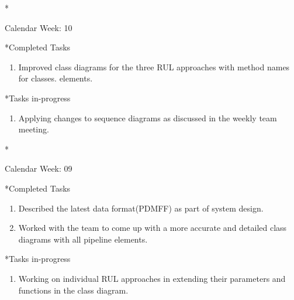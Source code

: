 \documentclass[11pt,a4paper]{article}
\begin{document}
\newpage
\begin{section}*{Calendar Week: 10  \hfill \date{12 March, 2021}}
 \begin{refsection}
     \begin{subsection}*{Completed Tasks}
         \begin{enumerate}
             \item
                   Improved class diagrams for the three RUL approaches with method names for classes.
                   elements.
         \end{enumerate}
     \end{subsection}
     \begin{subsection}*{Tasks in-progress}
         \begin{enumerate}
             \item
                   Applying changes to sequence diagrams as discussed in the weekly team meeting.
         \end{enumerate}
     \end{subsection}
 \end{refsection}
\end{section}


\newpage
\begin{section}*{Calendar Week: 09  \hfill \date{05 March, 2021}}
 \begin{refsection}
     \begin{subsection}*{Completed Tasks}
         \begin{enumerate}
             \item
                   Described the latest data format(PDMFF) as part of system design.
             \item
                   Worked with the team to come up with a more accurate and detailed class diagrams with all pipeline elements.
         \end{enumerate}
     \end{subsection}
     \begin{subsection}*{Tasks in-progress}
         \begin{enumerate}
             \item
                   Working on individual RUL approaches in extending their parameters and functions in the class diagram.
         \end{enumerate}
     \end{subsection}
 \end{refsection}
\end{section}
\end{document}
